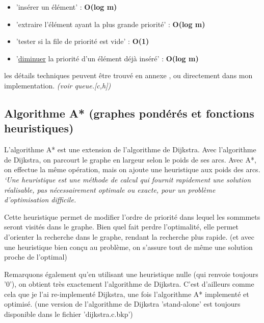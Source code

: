 \documentclass[a4paper,10pt]{article}
\begin{document}
      \begin{itemize}[label=-]
	\item 'insérer un élément' : \textbf{O(log m)}
	\item 'extraire l'élément ayant la plus grande priorité' : \textbf{O(log m)}
	\item 'tester si la file de priorité est vide' : \textbf{O(1)}
	\item '\underline{diminuer} la priorité d'un élément déjà inséré' : \textbf{O(log m)}
      \end{itemize}
      
      les détails techniques peuvent être trouvé en annexe \cite{binary_heap}, ou directement dans mon implementation. \textit{(voir queue.[c,h])}

      \subsection{Algorithme A* (graphes pondérés et fonctions heuristiques)}
    L'algorithme A* est une extension de l'algorithme de Dijkstra.\newline
    Avec l'algorithme de Dijkstra, on parcourt le graphe en largeur selon le poids de ses arcs.
    Avec A*, on effectue la même opération, mais on ajoute une heuristique aux poids des arcs.
    \textit{`Une heuristique est une méthode de calcul qui fournit rapidement une solution réalisable,
    pas nécessairement optimale ou exacte, pour un problème d'optimisation difficile.} \cite{heuristique}\newline
    
    Cette heuristique permet de modifier l'ordre de priorité dans lequel les sommmets seront visités dans le graphe.
    Bien quel fait perdre l'optimalité, elle permet d'orienter la recherche dans le graphe, rendant la recherche plus rapide.
    (et avec une heuristique bien conçu au problème, on s'assure tout de même une solution proche de l'optimal)\newline
    
    Remarquons également qu'en utilisant une heuristique nulle (qui renvoie toujours '0'), on obtient très exactement l'algorithme de Dijkstra.
    C'est d'ailleurs comme cela que je l'ai re-implementé Dijkstra, une fois l'algorithme A* implementé et optimisé.
    (une version de l'algorithme de Dijkstra 'stand-alone' est toujours disponible dans le fichier 'dijkstra.c.bkp')
    
\end{document}

